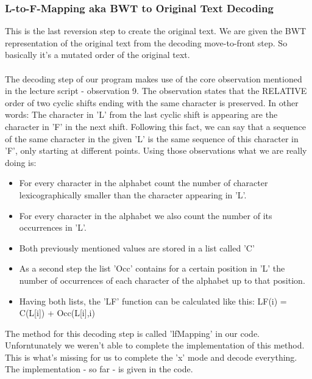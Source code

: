 \documentclass[11pt, notitlepage]{scrartcl}
\begin{document}
\subsubsection{L-to-F-Mapping aka BWT to Original Text Decoding}
This is the last reversion step to create the original text. We are given the BWT representation of the original text
from the decoding move-to-front step. So basically it's a mutated order of the original text. \\\\
The decoding step of our program makes use of the core observation mentioned in the lecture script - observation 9. The
observation states that the RELATIVE order of two cyclic shifts ending with the same character is preserved. In other
words:
The character in 'L' from the last cyclic shift is appearing are the character in 'F' in the next shift. Following this
fact, we can say that a sequence of the same character in the given 'L' is the same sequence of this character in 'F',
only starting at different points. Using those observations what we are really doing is: 
\begin{itemize}
    \item For every character in the alphabet count the number of character lexicographically smaller than the character
    appearing in 'L'.
    \item For every character in the alphabet we also count the number of its occurrences in 'L'.
    \item Both previously mentioned values are stored in a list called 'C'
    \item As a second step the list 'Occ' contains for a certain position in 'L' the number of occurrences of each
    character of the alphabet up to that position.
    \item Having both lists, the 'LF' function can be calculated like this: LF(i) = C(L[i]) + Occ(L[i],i)
\end{itemize}
The method for this decoding step is called 'lfMapping' in our code. Unforntunately we weren't able to complete the
implementation of this method. This is what's missing for us to complete the 'x' mode and decode everything. The
implementation - so far - is given in the code.
\end{document}

